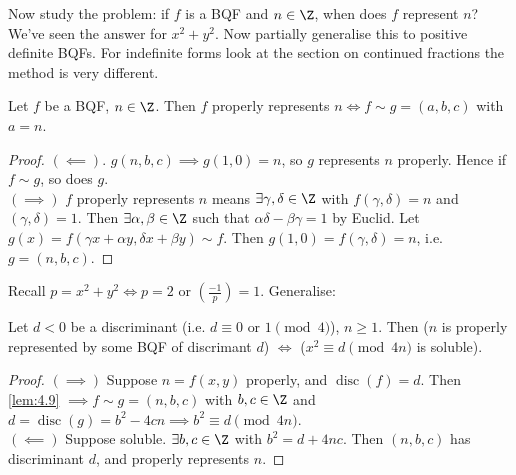 \documentclass{article}
\newcommand{\legendre}[2]{\genfrac{(}{)}{}{}{#1}{#2}}
\DeclareMathOperator{\disc}{disc}
\begin{document}
Now study the problem: if $f$ is a BQF and $n \in \Z$, when does $f$ represent $n$?
We've seen the answer for $x^2 + y^2$.
Now partially generalise this to positive definite BQFs.
For indefinite forms look at the section on continued fractions the method is very different.

\begin{nlemma}\label{lem:4.9}
    Let $f$ be a BQF, $n \in \Z$. Then $f$ properly represents $n \iff f \sim g = (a, b, c)$ with $a =n$.
\end{nlemma}

\begin{proof}
    $(\impliedby)$. $g(n, b, c) \implies g(1, 0) = n$, so $g$ represents $n$ properly. Hence if $f \sim g$, so does $g$. \\
    $(\implies)$ $f$ properly represents $n$ means $\exists \gamma, \delta \in \Z$ with $f(\gamma, \delta) = n$ and $(\gamma, \delta) = 1$.
    Then $\exists \alpha, \beta \in \Z$ such that $\alpha \delta - \beta \gamma = 1$ by Euclid.
    Let $g(x) = f(\gamma x + \alpha y, \delta x +\beta y) \sim f$.
    Then $g(1, 0) = f(\gamma, \delta) = n$, i.e. $g = (n, b, c)$.
\end{proof}

Recall $p = x^2 + y^2 \iff p = 2$ or $\legendre{-1}{p} = 1$. Generalise:

\begin{nthm}\label{thm:4.10}
    Let $d < 0$ be a discriminant (i.e. $d \equiv 0 \text{ or } 1 \pmod{4}$), $n \geq 1$.
    Then ($n$ is properly represented by some BQF of discrimant $d$) $\iff$ ($x^2 \equiv d \pmod{4n}$ is soluble).
\end{nthm}

\begin{proof}
    $(\implies)$ Suppose $n = f(x, y)$ properly, and $\disc(f) = d$.
    Then \cref{lem:4.9} $\implies f \sim g = (n, b, c)$ with $b, c \in \Z$ and $d = \disc(g) = b^2 - 4cn \implies b^2 \equiv d \pmod{4n}$.  \\
    $(\impliedby)$ Suppose soluble. $\exists b, c \in \Z$ with $b^2 = d + 4 n c$.
    Then $(n, b, c)$ has discriminant $d$, and properly represents $n$.
\end{proof}
\end{document}
